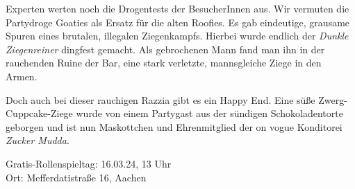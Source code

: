 \documentclass[final]{multiversum}
\begin{document}
Experten werten noch die Drogentests der BesucherInnen aus. Wir vermuten die
Partydroge Goaties als Ersatz für die alten Roofies. Es gab eindeutige, grausame
Spuren eines brutalen, illegalen Ziegenkampfs. Hierbei wurde endlich der
\emph{Dunkle Ziegenreiner} dingfest gemacht. Als gebrochenen Mann fand man ihn
in der rauchenden Ruine der Bar, eine stark verletzte, mannsgleiche Ziege in den
Armen.

Doch auch bei dieser rauchigen Razzia gibt es ein Happy End. Eine süße
Zwerg-Cuppcake-Ziege wurde von einem Partygast aus der sündigen Schokoladentorte
geborgen und ist nun Maskottchen und Ehrenmitglied der on vogue Konditorei
\emph{Zucker Mudda}.


\begin{termine}
\item Gratis-Rollenspieltag: 16.03.24, 13 Uhr\\
Ort: Mefferdatistraße 16, Aachen
\end{termine}
\impressum
\end{document}
